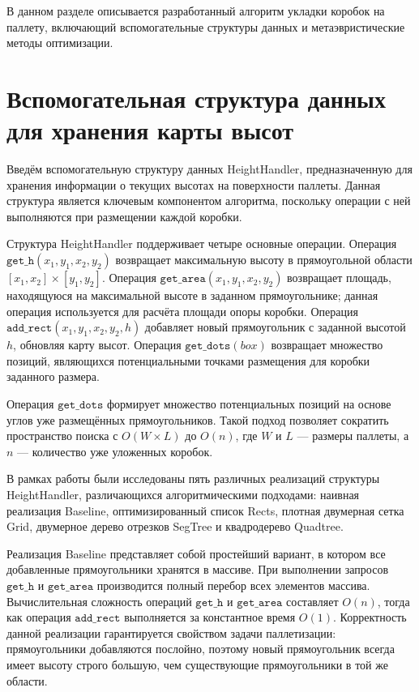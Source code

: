 
В данном разделе описывается разработанный алгоритм укладки коробок на паллету, включающий вспомогательные структуры данных и метаэвристические методы оптимизации.

\section{Вспомогательная структура данных для хранения карты высот}

Введём вспомогательную структуру данных HeightHandler, предназначенную для хранения информации о текущих высотах на поверхности паллеты. Данная структура является ключевым компонентом алгоритма, поскольку операции с ней выполняются при размещении каждой коробки.

Структура HeightHandler поддерживает четыре основные операции. Операция $\mathtt{get\_h}(x_1, y_1, x_2, y_2)$ возвращает максимальную высоту в прямоугольной области $[x_1, x_2] \times [y_1, y_2]$. Операция $\mathtt{get\_area}(x_1, y_1, x_2, y_2)$ возвращает площадь, находящуюся на максимальной высоте в заданном прямоугольнике; данная операция используется для расчёта площади опоры коробки. Операция $\mathtt{add\_rect}(x_1, y_1, x_2, y_2, h)$ добавляет новый прямоугольник с заданной высотой $h$, обновляя карту высот. Операция $\mathtt{get\_dots}(\mathit{box})$ возвращает множество позиций, являющихся потенциальными точками размещения для коробки заданного размера.

Операция $\mathtt{get\_dots}$ формирует множество потенциальных позиций на основе углов уже размещённых прямоугольников. Такой подход позволяет сократить пространство поиска с $O(W \times L)$ до $O(n)$, где $W$ и $L$ --- размеры паллеты, а $n$ --- количество уже уложенных коробок.

В рамках работы были исследованы пять различных реализаций структуры HeightHandler, различающихся алгоритмическими подходами: наивная реализация Baseline, оптимизированный список Rects, плотная двумерная сетка Grid, двумерное дерево отрезков SegTree и квадродерево Quadtree.

Реализация Baseline представляет собой простейший вариант, в котором все добавленные прямоугольники хранятся в массиве. При выполнении запросов $\mathtt{get\_h}$ и $\mathtt{get\_area}$ производится полный перебор всех элементов массива. Вычислительная сложность операций $\mathtt{get\_h}$ и $\mathtt{get\_area}$ составляет $O(n)$, тогда как операция $\mathtt{add\_rect}$ выполняется за константное время $O(1)$. Корректность данной реализации гарантируется свойством задачи паллетизации: прямоугольники добавляются послойно, поэтому новый прямоугольник всегда имеет высоту строго большую, чем существующие прямоугольники в той же области.

